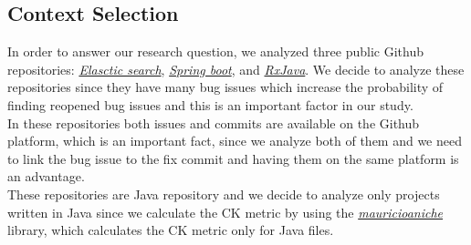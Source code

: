 \documentclass[sigconf,review]{acmart}
\begin{document}
\subsection{Context Selection}
In order to answer our research question, we analyzed three public Github repositories: \href{https://github.com/elastic/elasticsearch}{\emph{Elasctic search}}, \href{https://github.com/spring-projects/spring-boot}{\emph{Spring boot}}, and \href{https://github.com/ReactiveX/RxJava}{\emph{RxJava}}. We decide to analyze these repositories since they have many bug issues which increase the probability of finding reopened bug issues and this is an important factor in our study.\\
In these repositories both issues and commits are available on the Github platform, which is an important fact, since we analyze both of them and we need to link the bug issue to the fix commit and having them on the same platform is an advantage.\\
These repositories are Java repository and we decide to analyze only projects written in Java since we calculate the CK metric by using the  \href{https://github.com/mauricioaniche/ck}{\emph{mauricioaniche}} library, which calculates the CK metric only for Java files.
\end{document}
